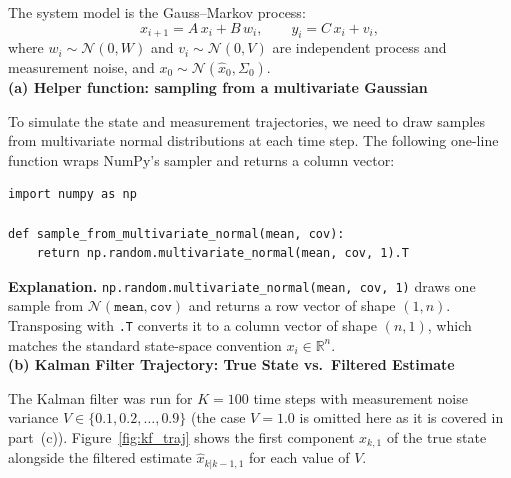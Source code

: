 \documentclass[12pt,a4paper,onecolumn]{exam}
\begin{document}
\begin{solution}

The system model is the Gauss--Markov process:
\[
  x_{i+1} = A\,x_i + B\,w_i, \qquad y_i = C\,x_i + v_i,
\]
where $w_i \sim \mathcal{N}(0, W)$ and $v_i \sim \mathcal{N}(0, V)$ are independent process and measurement noise, and $x_0 \sim \mathcal{N}(\hat{x}_0, \Sigma_0)$.\\

\textbf{(a) Helper function: sampling from a multivariate Gaussian}

To simulate the state and measurement trajectories, we need to draw samples from multivariate normal distributions at each time step. The following one-line function wraps NumPy's sampler and returns a column vector:

\begin{lstlisting}
import numpy as np

def sample_from_multivariate_normal(mean, cov):
    return np.random.multivariate_normal(mean, cov, 1).T
\end{lstlisting}

\textbf{Explanation.}
\texttt{np.random.multivariate\_normal(mean, cov, 1)} draws one sample from $\mathcal{N}(\texttt{mean}, \texttt{cov})$ and returns a row vector of shape $(1, n)$. Transposing with \texttt{.T} converts it to a column vector of shape $(n, 1)$, which matches the standard state-space convention $x_i \in \mathbb{R}^n$. \\

\textbf{(b) Kalman Filter Trajectory: True State vs.\ Filtered Estimate}

The Kalman filter was run for $K=100$ time steps with measurement noise variance $V \in \{0.1, 0.2, \ldots, 0.9\}$ (the case $V=1.0$ is omitted here as it is covered in part~(c)). Figure~\ref{fig:kf_traj} shows the first component $x_{k,1}$ of the true state alongside the filtered estimate $\hat{x}_{k|k-1,1}$ for each value of $V$.


\end{solution}
\end{document}
